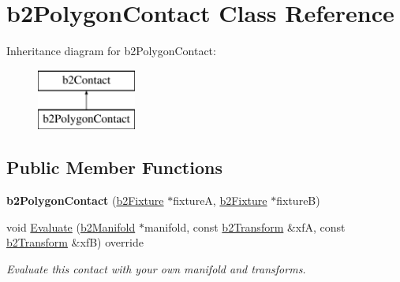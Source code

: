 \hypertarget{classb2PolygonContact}{}\section{b2\+Polygon\+Contact Class Reference}
\label{classb2PolygonContact}
Inheritance diagram for b2\+Polygon\+Contact\+:\begin{figure}[H]
\begin{center}
\leavevmode
\includegraphics[height=2.000000cm]{classb2PolygonContact}
\end{center}
\end{figure}
\subsection*{Public Member Functions}
\begin{DoxyCompactItemize}
\item 
\mbox{\label{classb2PolygonContact_a93cabf086e75ae40dcd1881760c71c63}} 
{\bfseries b2\+Polygon\+Contact} (\mbox{\hyperlink{classb2Fixture}{b2\+Fixture}} $\ast$fixtureA, \mbox{\hyperlink{classb2Fixture}{b2\+Fixture}} $\ast$fixtureB)
\item 
\mbox{\label{classb2PolygonContact_aa9581ba4a2bc769b80e3f107801d0950}} 
void \mbox{\hyperlink{classb2PolygonContact_aa9581ba4a2bc769b80e3f107801d0950}{Evaluate}} (\mbox{\hyperlink{structb2Manifold}{b2\+Manifold}} $\ast$manifold, const \mbox{\hyperlink{structb2Transform}{b2\+Transform}} \&xfA, const \mbox{\hyperlink{structb2Transform}{b2\+Transform}} \&xfB) override
\begin{DoxyCompactList}\small\item\em Evaluate this contact with your own manifold and transforms. \end{DoxyCompactList}\end{DoxyCompactItemize}
